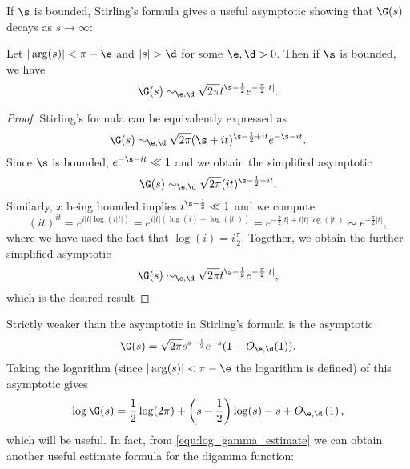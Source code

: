     If $\s$ is bounded, Stirling's formula gives a useful asymptotic showing that $\G(s)$ decays as $s \to \infty$:
    
    \begin{corollary}\label{equ:weaker_Stirling_formula}
    Let $|\arg(s)| < \pi-\e$ and $|s| > \d$ for some $\e,\d > 0$. Then if $\s$ is bounded, we have
      \[
        \G(s) \sim_{\e,\d} \sqrt{2\pi}t^{\s-\frac{1}{2}}e^{-\frac{\pi}{2}|t|}.
      \]
    \end{corollary}
    \begin{proof}
      Stirling's formula can be equivalently expressed as
      \[
        \G(s) \sim_{\e,\d} \sqrt{2\pi}(\s+it)^{\s-\frac{1}{2}+it}e^{-\s-it}.
      \]
      Since $\s$ is bounded, $e^{-\s-it} \ll 1$ and we obtain the simplified asymptotic
      \[
        \G(s) \sim_{\e,\d} \sqrt{2\pi}(it)^{\s-\frac{1}{2}+it}.
      \]
      Similarly, $x$ being bounded implies $i^{\s-\frac{1}{2}} \ll 1$ and we compute
      \[
        (it)^{it} = e^{i|t|\log(i|t|)} = e^{i|t|(\log(i)+\log(|t|))} = e^{-\frac{\pi}{2}|t|+i|t|\log(|t|)} \sim e^{-\frac{\pi}{2}|t|},
      \]
      where we have used the fact that $\log(i) = i\frac{\pi}{2}$. Together, we obtain the further simplified asymptotic
      \[
        \G(s) \sim_{\e,\d} \sqrt{2\pi}t^{\s-\frac{1}{2}}e^{-\frac{\pi}{2}|t|},
      \]
      which is the desired result
    \end{proof}
    Strictly weaker than the asymptotic in Stirling's formula is the asymptotic
    \begin{equation}
        \G(s) = \sqrt{2\pi}s^{s-\frac{1}{2}}e^{-s}(1+O_{\e,\d}(1)).
    \end{equation}
    Taking the logarithm (since $|\arg(s)| < \pi-\e$ the logarithm is defined) of this asymptotic gives
    \begin{equation}\label{equ:log_gamma_estimate}
      \log\G(s) = \frac{1}{2}\log(2\pi)+\left(s-\frac{1}{2}\right)\log(s)-s+O_{\e,\d}\left(1\right),
    \end{equation}
    which will be useful. In fact, from \cref{equ:log_gamma_estimate} we can obtain another useful estimate formula for the digamma function:

